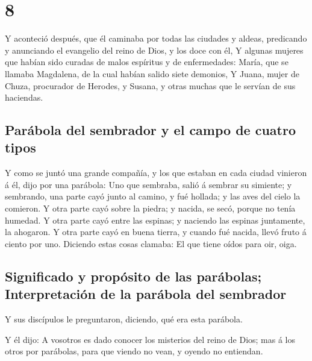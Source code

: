 \hypertarget{section-42-8}{%
\section{8}\label{section-42-8}}

 Y aconteció después, que él caminaba por todas las
ciudades y aldeas, predicando y anunciando el evangelio del reino de
Dios, y los doce con él,  Y algunas mujeres que habían
sido curadas de malos espíritus y de enfermedades: María, que se llamaba
Magdalena, de la cual habían salido siete demonios,  Y
Juana, mujer de Chuza, procurador de Herodes, y Susana, y otras muchas
que le servían de sus haciendas.

\hypertarget{paruxe1bola-del-sembrador-y-el-campo-de-cuatro-tipos}{%
\subsection{Parábola del sembrador y el campo de cuatro
tipos}\label{paruxe1bola-del-sembrador-y-el-campo-de-cuatro-tipos}}

 Y como se juntó una grande compañía, y los que estaban en
cada ciudad vinieron á él, dijo por una parábola:  Uno que
sembraba, salió á sembrar su simiente; y sembrando, una parte cayó junto
al camino, y fué hollada; y las aves del cielo la comieron.
 Y otra parte cayó sobre la piedra; y nacida, se secó,
porque no tenía humedad.  Y otra parte cayó entre las
espinas; y naciendo las espinas juntamente, la ahogaron. 
Y otra parte cayó en buena tierra, y cuando fué nacida, llevó fruto á
ciento por uno. Diciendo estas cosas clamaba: El que tiene oídos para
oir, oiga.

\hypertarget{significado-y-propuxf3sito-de-las-paruxe1bolas-interpretaciuxf3n-de-la-paruxe1bola-del-sembrador}{%
\subsection{Significado y propósito de las parábolas; Interpretación de
la parábola del
sembrador}\label{significado-y-propuxf3sito-de-las-paruxe1bolas-interpretaciuxf3n-de-la-paruxe1bola-del-sembrador}}

 Y sus discípulos le preguntaron, diciendo, qué era esta
parábola.

 Y él dijo: A vosotros es dado conocer los misterios del
reino de Dios; mas á los otros por parábolas, para que viendo no vean, y
oyendo no entiendan.

